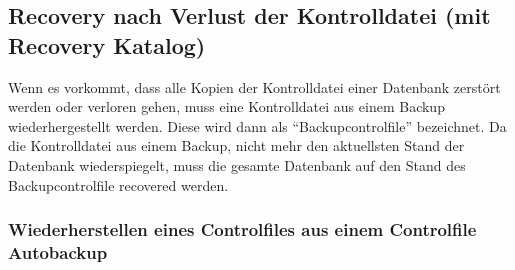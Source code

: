       \subsection{Recovery nach Verlust der Kontrolldatei (mit Recovery Katalog)}
        \label{recoverywithabackupcontrolfile}
        Wenn es vorkommt, dass alle Kopien der Kontrolldatei einer Datenbank zerst\"ort werden oder verloren gehen, muss eine Kontrolldatei aus einem Backup wiederhergestellt werden. Diese wird dann als \enquote{Backupcontrolfile} bezeichnet. Da die Kontrolldatei aus einem Backup, nicht mehr den aktuellsten Stand der Datenbank wiederspiegelt, muss die gesamte Datenbank auf den Stand des Backupcontrolfile recovered werden.
        \subsubsection{Wiederherstellen eines Controlfiles aus einem Controlfile Autobackup}
